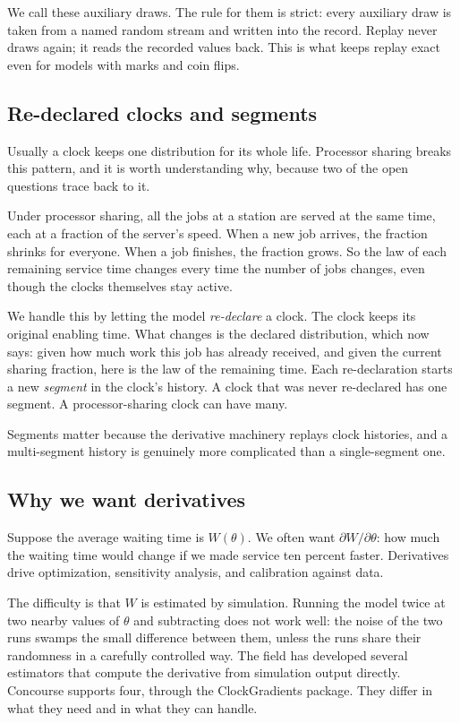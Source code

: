 \documentclass[11pt]{article}
\begin{document}
We call these auxiliary draws. The rule for them is strict: every
auxiliary draw is taken from a named random stream and written into the
record. Replay never draws again; it reads the recorded values back. This
is what keeps replay exact even for models with marks and coin flips.

\subsection{Re-declared clocks and segments}

Usually a clock keeps one distribution for its whole life. Processor
sharing breaks this pattern, and it is worth understanding why, because two
of the open questions trace back to it.

Under processor sharing, all the jobs at a station are served at the same
time, each at a fraction of the server's speed. When a new job arrives, the
fraction shrinks for everyone. When a job finishes, the fraction grows.
So the law of each remaining service time changes every time the
number of jobs changes, even though the clocks themselves stay active.

We handle this by letting the model \emph{re-declare} a clock. The clock
keeps its original enabling time. What changes is the declared
distribution, which now says: given how much work this job has already
received, and given the current sharing fraction, here is the law of the
remaining time. Each re-declaration starts a new \emph{segment} in the
clock's history. A clock that was never re-declared has one segment. A
processor-sharing clock can have many.

Segments matter because the derivative machinery replays clock histories,
and a multi-segment history is genuinely more complicated than a
single-segment one.

\subsection{Why we want derivatives}

Suppose the average waiting time is $W(\theta)$. We often want
$\partial W / \partial \theta$: how much the waiting time would change if
we made service ten percent faster. Derivatives drive optimization,
sensitivity analysis, and calibration against data.

The difficulty is that $W$ is estimated by simulation. Running the model
twice at two nearby values of $\theta$ and subtracting does not work well:
the noise of the two runs swamps the small difference between them, unless
the runs share their randomness in a carefully controlled way. The field has developed several estimators that compute
the derivative from simulation output directly. Concourse supports four,
through the ClockGradients package. They differ in what they need and in
what they can handle.
\end{document}
